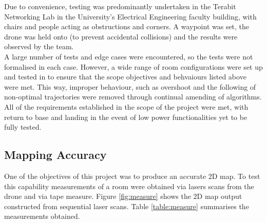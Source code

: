 \documentclass[capstone_report.tex]{subfiles}
\begin{document}
Due to convenience, testing was predominantly undertaken in the Terabit Networking Lab in the University’s Electrical Engineering faculty building, with chairs and people acting as obstructions and corners. A waypoint was set, the drone was held onto (to prevent accidental collisions) and the results were observed by the team.\\

A large number of tests and edge cases were encountered, so the tests were not formalised in each case. However, a wide range of room configurations were set up and tested in to ensure that the scope objectives and behvaiours listed above were met. This way, improper behaviour, such as overshoot and the following of non-optimal trajectories were removed through continual amending of algorithms. All of the requirements established in the scope of the project were met, with return to base and landing in the event of low power functionalities yet to be fully tested.

\subsection{Mapping Accuracy}

One of the objectives of this project was to produce an accurate 2D map.  To test this capability measurements of a room were obtained via lasers scans from the drone and via tape measure.  Figure \ref{fig:measure} shows the 2D map output constructed from sequential laser scans.  Table \ref{table:measure} summarises the measurements obtained.  
\end{document}
